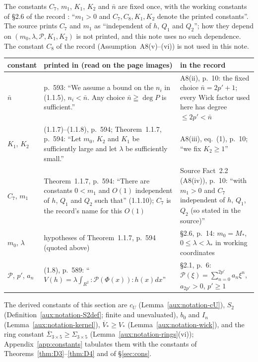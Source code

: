 The constants $C_7$, $m_1$, $K_1$, $K_2$ and $\bar n$ are fixed once, with the working
constants of \S2.6 of the record \cite[p.~14]{R}: ``$m_1>0$ and $C_7,C_8,K_1,K_2$ denote the
printed constants''.  The source prints $C_7$ and $m_1$ as ``independent of $h$, $Q_1$ and
$Q_2$''; how they depend on $(m_0,\lambda,\mathscr P,K_1,K_2)$ is not printed, and this note
uses no such dependence.  The constant $C_8$ of the record (Assumption~A8(v)--(vi)) is not
used in this note.

\begin{center}
\small
\begin{tabular}{@{}p{}p{}p{}@{}}
\toprule
constant & printed in \cite{GJS} (read on the page images) & in the record \cite{R}\\
\midrule
$\bar n$ & p.~593: ``We assume a bound on the $n_i$ in (1.1.5), $n_i<\bar n$. Any choice
$\bar n\geqq\deg P$ is sufficient.'' & A8(ii), p.~10: the fixed choice $\bar n=2p'+1$; every
Wick factor used here has degree $\le2p'<\bar n$\\
$K_1$, $K_2$ & (1.1.7)--(1.1.8), p.~594; Theorem~1.1.7, p.~594: ``Let $m_0$, $K_2$ and $K_1$ be
sufficiently large and let $\lambda$ be sufficiently small.'' & A8(iii), eq.~(1), p.~10;
``we fix $K_2\ge1$''\\
$C_7$, $m_1$ & Theorem~1.1.7, p.~594: ``There are constants $0<m_1$ and $O(1)$ independent of
$h$, $Q_1$ and $Q_2$ such that'' (1.1.10); $C_7$ is the record's name for this $O(1)$ &
Source Fact~2.2 (A8(iv)), p.~10: ``with $m_1>0$ and $C_7$ independent of $h$, $Q_1$, $Q_2$
(so stated in the source)''\\
$m_0$, $\lambda$ & hypotheses of Theorem~1.1.7, p.~594 (quoted above) & \S2.6, p.~14: $m_0=M_*$,
$0\le\lambda<\lambda_*$ in working coordinates\\
$\mathscr P$, $p'$, $a_n$ & (1.8), p.~589: ``$V(h)=\lambda\int_{R^2}:\mathscr P(\Phi(x)):h(x)dx$'' &
\S2.1, p.~6: $\mathscr P(\xi)=\sum_{n=0}^{2p'}a_n\xi^n$, $a_{2p'}>0$, $p'\ge1$\\
\bottomrule
\end{tabular}
\end{center}

The derived constants of this section are $c_U$ (Lemma~\ref{aux:notation-cU}), $S_2$
(Definition~\ref{aux:notation-S2def}; finite and unevaluated), $b_0$ and $I_n$
(Lemma~\ref{aux:notation-kernel}), $\overline V_*\ge V_*$ (Lemma~\ref{aux:notation-wick}),
and the ring constant $\overline\Sigma_{3\times5}\ge\Sigma_{3\times5}$
(Lemma~\ref{aux:notation-rings}(vi)); Appendix~\ref{app:constants}
tabulates them with the constants of Theorems~\ref{thm:D3}--\ref{thm:D4} and of
\S\ref{sec:cons}.
